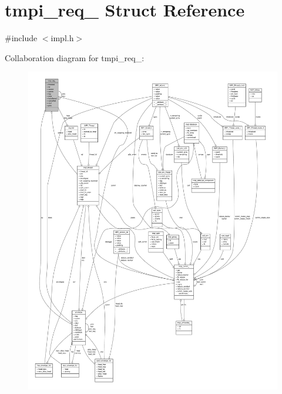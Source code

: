 \hypertarget{structtmpi__req__}{\section{tmpi\-\_\-req\-\_\- \-Struct \-Reference}
\label{structtmpi__req__}
}


{\ttfamily \#include $<$impl.\-h$>$}



\-Collaboration diagram for tmpi\-\_\-req\-\_\-\-:
\nopagebreak
\begin{figure}[H]
\begin{center}
\leavevmode
\includegraphics[width=350pt]{structtmpi__req____coll__graph}
\end{center}
\end{figure}
